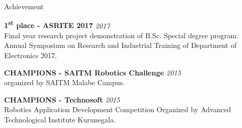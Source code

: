 \documentclass[
	11pt, %
]{./assets/resume} %
\begin{document}









\begin{rSection}{Achievement}

	\textbf{1\textsuperscript{st} place - ASRITE 2017} \hfill \textit{2017} \\ 
	Final year research project demonstration of B.Sc. Special degree program. Annual Symposium on Research and Industrial Training of Department of Electronics 2017.

	\textbf{CHAMPIONS - SAITM Robotics Challenge} \hfill \textit{2015} \\ 
	organized by SAITM Malabe Campus.

	\textbf{CHAMPIONS - Technosoft} \hfill \textit{2015} \\ 
	Robotics Application Development Competition Organized by Advanced Technological Institute Kurunegala.

\end{rSection}

\end{document}
